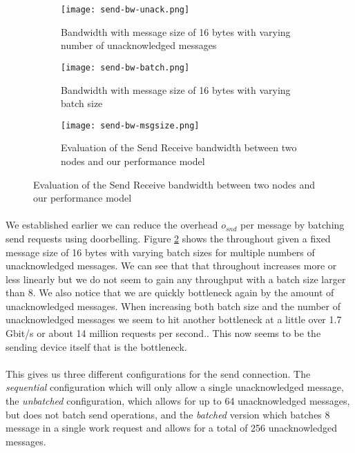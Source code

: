 \begin{figure}[]
\begin{subfigure}[b]{0.49\textwidth}
  \centering
  \texttt{[image: send-bw-unack.png]}
  \caption{Bandwidth with message size of 16 bytes with varying number of unacknowledged messages}
  \label{fig:plot-sndrcv-bw-unack}
\end{subfigure}
\begin{subfigure}[b]{0.49\textwidth}
  \centering
  \texttt{[image: send-bw-batch.png]}
  \caption{Bandwidth with message size of 16 bytes with varying batch size }
  \label{fig:plot-sndrcv-bw-batch}
\end{subfigure}
\begin{subfigure}[b]{1\textwidth}
  \centering
  \texttt{[image: send-bw-msgsize.png]}
  \caption{Evaluation of the Send Receive bandwidth between two nodes and our performance model}
  \label{fig:plot-sndrcv-bw}
\end{subfigure}
\end{figure}


\paragraph{} We established earlier we can reduce the overhead $o_{snd}$ per message by batching send requests using
doorbelling. Figure \ref{fig:plot-sndrcv-bw-batch} shows the throughout given a fixed message size of 16 bytes with 
varying batch sizes for multiple numbers of unacknowledged messages. We can see that that throughout increases more or
less linearly but we do not seem to gain any throughput with a batch size larger than 8. We also notice that we are
quickly bottleneck again by the amount of unacknowledged messages. When increasing both batch size and the number of
unacknowledged messages we seem to hit another bottleneck at a little over 1.7 Gbit/s or about 14 million requests 
per second.. This now seems to be the sending device itself that 
is the bottleneck.



\paragraph{} This gives us three different configurations for the send connection. The \emph{sequential} configuration
which will only allow a single unacknowledged message, the \emph{unbatched} configuration, which allows for up to 64
unacknowledged messages, but does not batch send operations, and the \emph{batched} version which batches 8 message
in a single work request and allows for a total of 256 unacknowledged messages.

